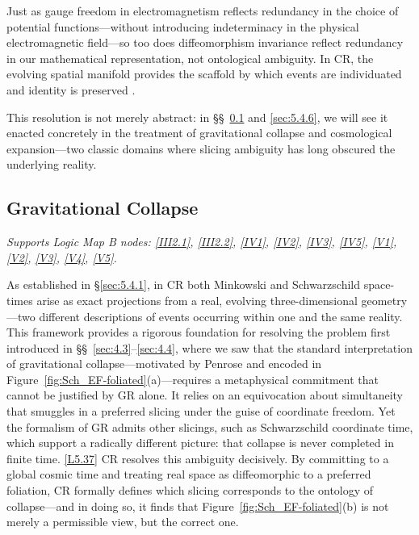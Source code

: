 \documentclass[12pt]{book}
\newcounter{logicanchor}
\newenvironment{logicanchorenv}[1]{\refstepcounter{logicanchor}\label{#1}}{}
\newcommand{\logiclink}[2]{\begin{logicanchorenv}{logic:#1}\end{logicanchorenv}\hyperref[appendix:#1]{[#1]}\xspace}
\begin{document}
Just as gauge freedom in electromagnetism reflects redundancy in the choice of potential functions---without introducing indeterminacy in the physical electromagnetic field---so too does diffeomorphism invariance reflect redundancy in our mathematical representation, not ontological ambiguity. In CR, the evolving spatial manifold provides the scaffold by which events are individuated and identity is preserved \citep{weyl1949}.

This resolution is not merely abstract: in \S\S~\ref{sec:5.4.4} and \ref{sec:5.4.6}, we will see it enacted concretely in the treatment of gravitational collapse and cosmological expansion---two classic domains where slicing ambiguity has long obscured the underlying reality.

\subsection{Gravitational Collapse}\label{sec:5.4.4}
\noindent\textit{Supports Logic Map B nodes: \hyperref[appendix:III2.1]{[III2.1]}, \hyperref[appendix:III2.2]{[III2.2]}, \hyperref[appendix:IV1]{[IV1]}, \hyperref[appendix:IV2]{[IV2]}, \hyperref[appendix:IV3]{[IV3]}, \hyperref[appendix:IV5]{[IV5]}, \hyperref[appendix:V1]{[V1]}, \hyperref[appendix:V2]{[V2]}, \hyperref[appendix:V3]{[V3]}, \hyperref[appendix:V4]{[V4]}, \hyperref[appendix:V5]{[V5]}.}

\vspace{4pt}

As established in \S\ref{sec:5.4.1}, in CR both Minkowski and Schwarzschild space-times arise as exact projections from a real, evolving three-dimensional geometry---two different descriptions of events occurring within one and the same reality. This framework provides a rigorous foundation for resolving the problem first introduced in \S\S~\ref{sec:4.3}--\ref{sec:4.4}, where we saw that the standard interpretation of gravitational collapse---motivated by Penrose and encoded in Figure~\ref{fig:Sch_EF-foliated}(a)---requires a metaphysical commitment that cannot be justified by GR alone. It relies on an equivocation about simultaneity that smuggles in a preferred slicing under the guise of coordinate freedom. Yet the formalism of GR admits other slicings, such as Schwarzschild coordinate time, which support a radically different picture: that collapse is never completed in finite time. \logiclink{L5.37}{} CR resolves this ambiguity decisively. By committing to a global cosmic time and treating real space as diffeomorphic to a preferred foliation, CR formally defines which slicing corresponds to the ontology of collapse---and in doing so, it finds that Figure~\ref{fig:Sch_EF-foliated}(b) is not merely a permissible view, but the correct one.
\end{document}
